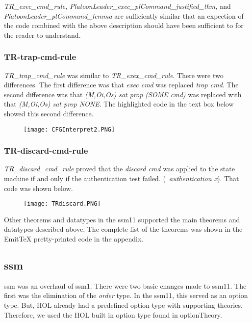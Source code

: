 \emph{TR_exec_cmd_rule, PlatoonLeader_exec_plCommand_justified_thm,} and \emph{PlatoonLeader_plCommand_lemma} are sufficiently similar that an expection of the code combined with the above description should have been sufficient to for the reader to understand.
 
 
\subsubsection{TR-trap-cmd-rule}
\label{sec:tr-trap-cmd}


\emph{TR_trap_cmd_rule} was similar to \emph{TR_exex_cmd_rule}.  There were two differences.  The first difference was that \emph{exec cmd} was replaced \emph{trap cmd}.  The second difference was that \emph{(M,Oi,Os) sat prop (SOME cmd)} was replaced with that \emph{(M,Oi,Os) sat prop  NONE}.  The highlighted code in the text box below showed this second difference.\\
  
  \begin{figure}[h]
  \centering
  \texttt{[image: CFGInterpret2.PNG]}
\end{figure}


\subsubsection{TR-discard-cmd-rule}
\label{sec:tr-discard-cmd}

  \textit{TR_discard_cmd_rule} proved that the \textit{discard cmd} was applied to the state machine
  if and only if the authentication test failed.  (\textit{~authentication x}).  That code was shown below.\\
  
  \begin{figure}[h]
  \centering
  \texttt{[image: TRdiscard.PNG]}
\end{figure}

Other theorems and datatypes in the ssm11 supported the main theorems and datatypes described above.  The complete list of the theorems was shown in the EmitTeX pretty-printed code in the appendix.


\subsection{ssm}
\label{sec:ssm-1}

ssm was an overhaul of ssm1.  There were two basic changes made to ssm11.  The first was the elimination of the \emph{order} type.  In the ssm11, this served as an option type.  But, HOL already had a predefined option type with supporting theories.  Therefore, we used the HOL built in option type found in optionTheory. \\
  
